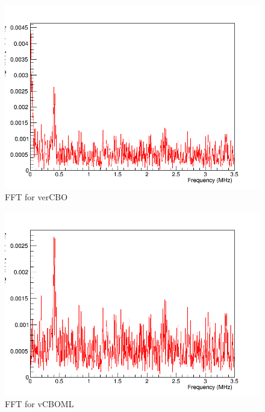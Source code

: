 \begin{figure}[!h]
\centering 
\includegraphics[scale=0.5]{Figures/verCBO_fft.png}
\decoRule
\caption{FFT for verCBO}
\label{fig:verCBO_fft}
\end{figure}

\begin{figure}[!h]
\centering 
\includegraphics[scale=0.5]{Figures/vCBOML_fft.png}
\decoRule
\caption{FFT for vCBOML}
\label{fig:vCBOML_fft}
\end{figure}

